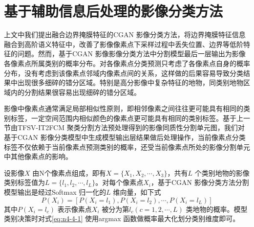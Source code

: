 

\section{基于辅助信息后处理的影像分类方法}
\label{sec::chap04-4}
上文中我们提出融合边界掩膜特征的CGAN 影像分类方法，将边界掩膜特征信息融合到高阶语义特征中，改善了影像像素点下采样过程中丢失位置、边界等低阶特征的问题。然而，基于CGAN 影像影像分类方法中分割模型最后一层输出为影像各像素点所属类别的概率分布。对各像素点分类预测只考虑了各像素点自身的概率分布，没有考虑到该像素点邻域内像素点间的关系，这样做的后果容易导致分类结果中出现很多细碎的错分区域。特别是高分影像中复杂特征的地物，同类别地物区域内的分割结果很容易出现细碎的错分区域。

影像中像素点通常满足局部相似性原则，即相邻像素之间往往更可能具有相同的类别标签，一定空间范围内相似颜色的像素点更可能具有相同的类别标签。基于上一节由TFSV-IT2FCM 聚类分割方法预处理得到的影像同质性分割单元图，我们对基于CGAN 影像分类模型中生成模型输出层结果做后处理操作，当前像素点分类标签不仅依赖于当前像素点预测类别的概率，还受当前像素点所处的影像分割单元中其他像素点的影响。




设影像$X$ 由N个像素点组成，即有$X = \{X_1,X_2,\cdots,X_3\}$，共有$L$ 个类别地物的影像类别标签值为$L = \{l_1,l_2, \cdots, l_L \}$。对每个像素点$X_i$，基于CGAN 影像分类方法分割模型输出是经过Softmax 归一化的$L$ 维向量，如下式
\begin{equation}\label{eq:n4-4-1}
    P(X_i) = [P(X_i=l_1),P(X_i=l_2),\cdots,P(X_i=l_L)]
\end{equation}
其中$P(X_i=l_c)$ 表示像素点$X_i$ 被分为第$l_c(c=1,2,\cdots,L)$ 类地物的概率。模型类别决策时对式\ref{eq:n4-4-1} 使用argmax 函数做概率最大化划分类别维度即可。


